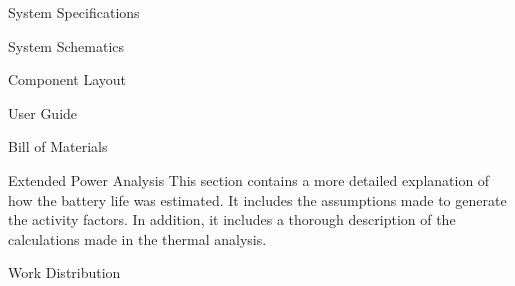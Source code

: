 \documentclass[12pt,letterpaper]{article}
\begin{document}




%

\listoftodos
\tableofcontents \newpage
\listoffigures \newpage
\listoftables \newpage
{}

%
%


%
%
%
%


%
%





\appendix
\addappheadtotoc

\begin{customAppendixPage}{System Specifications}
\lipsum[1]
\end{customAppendixPage}
\renewcommand*{\thepage}{\thesection-\arabic{page}}


\begin{customAppendixPage}{System Schematics}
\lipsum[1]
\end{customAppendixPage}
\renewcommand*{\thepage}{\thesection-\arabic{page}}


\begin{customAppendixPage}{Component Layout}
\lipsum[1]
\end{customAppendixPage}
\renewcommand*{\thepage}{\thesection-\arabic{page}}


\begin{customAppendixPage}{User Guide}
\lipsum[1]
\end{customAppendixPage}
\renewcommand*{\thepage}{\thesection-\arabic{page}}

\begin{customAppendixPage}{Bill of Materials}
\lipsum[1]
\end{customAppendixPage}
\renewcommand*{\thepage}{\thesection-\arabic{page}}


\begin{customAppendixPage}{Extended Power Analysis}
This section contains a more detailed explanation of how the battery life was estimated.  It includes the assumptions made to generate the activity factors.  In addition, it includes a thorough description of the calculations made in the thermal analysis.
\end{customAppendixPage}
\renewcommand*{\thepage}{\thesection-\arabic{page}}




\begin{customAppendixPage}{Work Distribution}
\lipsum[1]
\end{customAppendixPage}
\renewcommand*{\thepage}{\thesection-\arabic{page}}
\end{document}
